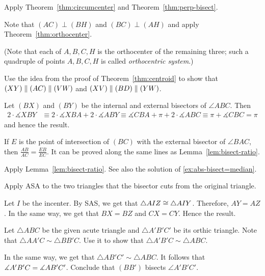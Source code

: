 \setcounter{eqtn}{0}

Apply Theorem~\ref{thm:circumcenter} and Theorem~\ref{thm:perp-bisect}.

Note that $(AC)\perp (BH)$ and $(BC)\perp (AH)$ and apply Theorem~\ref{thm:orthocenter}.

(Note that each of $A,B,C,H$ is the orthocenter of the remaining three; such a quadruple of points $A,B,C,H$ is called \emph{orthocentric system}.)

Use the idea from the proof of Theorem~\ref{thm:centroid}
to show that $(XY)\parallel (AC)\z\parallel (VW)$ and
$(XV)\parallel (BD)\z\parallel (YW)$.

Let $(BX)$ and $(BY)$ be the internal and external bisectors of $\angle ABC$.
Then 
\begin{align*}
2\cdot \measuredangle XBY&\equiv2\cdot \measuredangle XBA+2\cdot \measuredangle ABY\equiv
\measuredangle CBA+\pi+2\cdot \measuredangle ABC\equiv
 \pi+\measuredangle CBC=\pi
\end{align*}
and hence the result.

If $E$ is the point of intersection of $(BC)$ 
with the external bisector of $\angle BAC$, then 
$\frac{AB}{AC}=\frac{EB}{EC}$.
It can be proved along the same lines as Lemma~\ref{lem:bisect-ratio}.

Apply Lemma~\ref{lem:bisect-ratio}.
See also the solution of \ref{ex:abs-bisect=median}.

Apply ASA to the two triangles that the bisector cuts from the original triangle. 

Let $I$ be the incenter.
By SAS, we get that $\triangle AIZ\z\cong\triangle AIY$.
Therefore, $AY=AZ$.
In the same way, we get that $BX=BZ$ and $CX=CY$.
Hence the result.

Let $\triangle ABC$ be the given acute triangle and $\triangle A'B'C'$ 
be its orthic triangle.
Note that $\triangle AA'C\sim\triangle BB'C$.
Use it to show that $\triangle A'B'C\sim \triangle ABC$.

In the same way, we get that $\triangle AB'C'\sim \triangle ABC$.
It follows that $\measuredangle A'B'C\z=\measuredangle AB'C'$.
Conclude that $(BB')$ bisects $\angle A'B'C'$.

